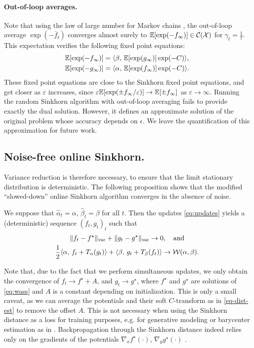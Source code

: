 \paragraph{Out-of-loop averages.} Note that using the law of large number for Markov chains
\citep{breiman_strong_1960}, the out-of-loop average $\exp(-\bar f_t)$
converges almost surely to $\mathbb{E}[\exp(-f_\infty)]
 \in \mathcal{C}(\mathcal{X})$ for $\gamma_t = 
 \frac{1}{t}$. This expectation verifies the following fixed point equations:
\begin{align}
    \mathbb{E}[\exp(-f_\infty)] &=
     \langle \beta,\,\mathbb{E}[\exp(g_\infty)] \exp(-C)\rangle, \\
    \mathbb{E}[\exp(-g_\infty)] &=
     \langle \alpha,\,\mathbb{E}[\exp(f_\infty)] \exp(-C)\rangle.
\end{align}
These fixed point equations are close to the Sinkhorn fixed point equations, and
get closer as $\varepsilon$ increases, since $\varepsilon \mathbb{E}[\exp(\pm f_\infty /
\varepsilon)] \to \mathbb{E}[\pm f_\infty]$ as $\varepsilon \to \infty$. Running the random
Sinkhorn algorithm with out-of-loop averaging fails to provide exactly the dual solution.
However, it defines an approximate solution of the original problem whose accuracy depends on $\epsilon$. 
%
We leave the quantification of this approximation for future work.

\subsection{Noise-free online Sinkhorn.}

Variance reduction is therefore necessary, to ensure that the limit stationary
distribution is deterministic. The following proposition shows that the modified ``slowed-down'' online Sinkhorn algorithm converges in the absence of noise.

\begin{proposition}\label{eq:deterministic}
    We suppose that $\hat \alpha_t = \alpha$, $\hat \beta_t = \beta$ for all
    $t$. Then the updates \eqref{eq:updates} yields a (deterministic) sequence $(f_t, g_t)_t$ such
    that 
    \begin{gather}
        \Vert f_t - f^\star \Vert_{\text{var}} 
        + \Vert g_t - g^\star \Vert_{\text{var}} \to 0,\quad\text{and} \\
        \frac{1}{2} \langle \alpha,\,f_t + T_{\alpha}(g_t)\rangle + \langle \beta,\,g_t + T_{\beta}(f_t)\rangle 
         \to \mathcal{W}(\alpha, \beta).
    \end{gather}
\end{proposition}
Note that, due to the fact that we perform simultaneous updates, we only obtain
the convergence of $f_t \to f^\star + A$, and $g_t \to g^\star$, where $f^\star$
and $g^\star$ are solutions of \eqref{eq:wass} and $A$ is a constant depending
on initialization. This is only a small caveat, as we can average the potentials
and their soft $C$-transform as in \eqref{eq-dist-est} to remove the offset $A$.
This is not necessary when using the Sinkhorn distance as a loss for training
purposes, e.g. for generative modeling or barycenter estimation as in
\citet{staib2017parallel}. Backpropagation through the Sinkhorn distance indeed
relies only on the gradients of the potentials $\nabla_x f^\star(\cdot)$,
$\nabla_y g^\star(\cdot)$ \citep[e.g.][]{cuturi2018semidual}.
